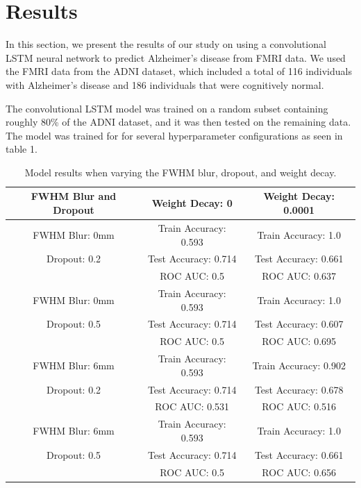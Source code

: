\documentclass[11pt]{article}
\begin{document}
	\section{Results}

	In this section, we present the results of our study on using a convolutional LSTM neural network to predict Alzheimer's disease from FMRI data. We used the FMRI data from the ADNI dataset, which included a total of 116 individuals with Alzheimer's disease and 186 individuals that were cognitively normal.

	The convolutional LSTM model was trained on a random subset containing roughly 80\% of the ADNI dataset, and it was then tested on the remaining data. The model was trained for for several hyperparameter configurations as seen in table 1. 


	\begin{table}[!ht]
		\centering
		\begin{tabular}{|| c | c | c ||} 
			\hline
			FWHM Blur and Dropout & Weight Decay: 0 & Weight Decay: 0.0001 \\ [0.5ex] 
			\hline\hline
			FWHM Blur: 0mm & Train Accuracy: 0.593 & Train Accuracy: 1.0 \\
			Dropout: 0.2 & Test Accuracy: 0.714 & Test Accuracy: 0.661 \\
			 & ROC AUC: 0.5 & ROC AUC: 0.637 \\
			\hline
			FWHM Blur: 0mm & Train Accuracy: 0.593 & Train Accuracy: 1.0 \\
			Dropout: 0.5 & Test Accuracy: 0.714 & Test Accuracy: 0.607 \\
			 & ROC AUC: 0.5 & ROC AUC: 0.695 \\
			\hline
			FWHM Blur: 6mm & Train Accuracy: 0.593 & Train Accuracy: 0.902 \\
			Dropout: 0.2 & Test Accuracy: 0.714 & Test Accuracy: 0.678 \\
			 & ROC AUC: 0.531 & ROC AUC: 0.516 \\
			\hline
			FWHM Blur: 6mm & Train Accuracy: 0.593 & Train Accuracy: 1.0 \\
			Dropout: 0.5 & Test Accuracy: 0.714 & Test Accuracy: 0.661 \\
			 & ROC AUC: 0.5 & ROC AUC: 0.656 \\
			\hline
		\end{tabular}
		\caption{Model results when varying the FWHM blur, dropout, and weight decay.}
		\label{tab:performance}
	\end{table}
\end{document}
